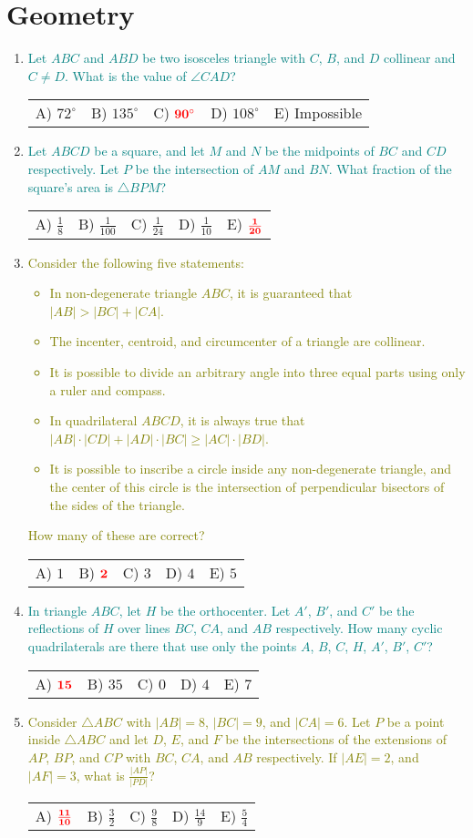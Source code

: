 \documentclass{article}
\newcommand{\answers}[5]{
    \newline
    {
        \centering
        \begin{tabular}{*{5}{p{0.15\textwidth}}}
            A) #1 & B) #2 & C) #3 & D) #4 & E) #5
        \end{tabular}
    }
}
\newcommand{\correct}[1]{
    \mathbf{\textcolor{red}{#1}}
}
\newcommand{\mustintermediate}[1]{
    \textcolor{teal}{#1}
}
\newcommand{\canadvanced}[1]{
    \textcolor{olive}{#1}
}
\begin{document}
\section{Geometry}
\begin{enumerate}[1.]

\item %
\mustintermediate{Let $ABC$ and $ABD$ be two isosceles triangle with $C$, $B$, and $D$ collinear and $C \ne D$.
What is the value of $\angle CAD$?}
\answers{$72^\circ$}{$135^\circ$}{$\correct{90^\circ}$}{$108^\circ$}{Impossible}


\item %
\mustintermediate{Let $ABCD$ be a square, and let $M$ and $N$ be the midpoints of $BC$ and $CD$ respectively.
Let $P$ be the intersection of $AM$ and $BN$.
What fraction of the square's area is $\triangle BPM$?}
\answers{ $\frac{1}{8}$ }{ $\frac{1}{100}$ }{ $\frac{1}{24}$ }{ $\frac{1}{10}$ }{ $\correct{\frac{1}{20}}$ }


\item %
\canadvanced{Consider the following five statements:
\begin{itemize}
    \item In non-degenerate triangle $ABC$, it is guaranteed that $|AB| > |BC| + |CA|$.
    \item The incenter, centroid, and circumcenter of a triangle are collinear.
    \item It is possible to divide an arbitrary angle into three equal parts using only a ruler and compass.
    \item In quadrilateral $ABCD$, it is always true that $|AB| \cdot |CD| + |AD| \cdot |BC| \ge |AC| \cdot |BD|$.
    \item It is possible to inscribe a circle inside any non-degenerate triangle, and the center of this circle is the intersection of perpendicular bisectors of the sides of the triangle.
\end{itemize}
How many of these are correct?}
\answers{$1$}{$\correct{2}$}{$3$}{$4$}{$5$}

\item %
\mustintermediate{In triangle $ABC$, let $H$ be the orthocenter.
Let $A'$, $B'$, and $C'$ be the reflections of $H$ over lines $BC$, $CA$, and $AB$ respectively.
How many cyclic quadrilaterals are there that use only the points $A$, $B$, $C$, $H$, $A'$, $B'$, $C'$?}
\answers{$\correct{15}$}{$35$}{$0$}{$4$}{$7$}


\item %
\canadvanced{Consider $\triangle ABC$ with $|AB| = 8$, $|BC| = 9$, and $|CA| = 6$.
Let $P$ be a point inside $\triangle ABC$ and let $D$, $E$, and $F$ be the intersections of the extensions of $AP$, $BP$, and $CP$ with $BC$, $CA$, and $AB$ respectively.
If $|AE| = 2$, and $|AF| = 3$, what is $\frac{|AP|}{|PD|}$?}
\answers{ $\correct{\frac{11}{10}}$ }{ $\frac{3}{2}$ }{ $\frac{9}{8}$ }{ $\frac{14}{9}$ }{ $\frac{5}{4}$ }

\end{enumerate}
\end{document}
